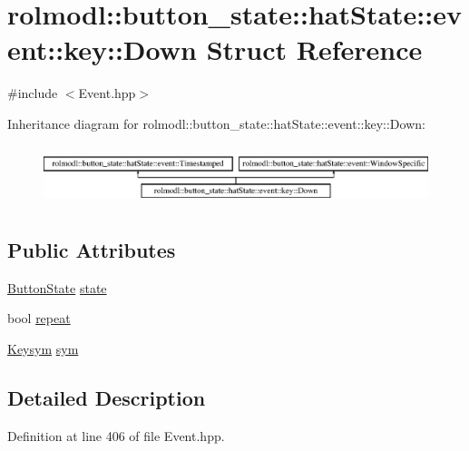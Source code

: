 \hypertarget{structrolmodl_1_1button__state_1_1hat_state_1_1event_1_1key_1_1_down}{}\section{rolmodl\+::button\+\_\+state\+::hat\+State\+::event\+::key\+::Down Struct Reference}
\label{structrolmodl_1_1button__state_1_1hat_state_1_1event_1_1key_1_1_down}


{\ttfamily \#include $<$Event.\+hpp$>$}

Inheritance diagram for rolmodl\+::button\+\_\+state\+::hat\+State\+::event\+::key\+::Down\+:\begin{figure}[H]
\begin{center}
\leavevmode
\includegraphics[height=1.761006cm]{structrolmodl_1_1button__state_1_1hat_state_1_1event_1_1key_1_1_down}
\end{center}
\end{figure}
\subsection*{Public Attributes}
\begin{DoxyCompactItemize}
\item 
\mbox{\hyperlink{namespacerolmodl_ad08ec5c56aa1db118f871357b2d475fd}{Button\+State}} \mbox{\hyperlink{structrolmodl_1_1button__state_1_1hat_state_1_1event_1_1key_1_1_down_ae559eb7cd15c7356e87bbf98fb99a433}{state}}
\item 
bool \mbox{\hyperlink{structrolmodl_1_1button__state_1_1hat_state_1_1event_1_1key_1_1_down_a55a7ee2bce64a0aeb71515d769fd5394}{repeat}}
\item 
\mbox{\hyperlink{structrolmodl_1_1button__state_1_1_keysym}{Keysym}} \mbox{\hyperlink{structrolmodl_1_1button__state_1_1hat_state_1_1event_1_1key_1_1_down_a7c4c614aaab0eb8e11a11824f7516e44}{sym}}
\end{DoxyCompactItemize}


\subsection{Detailed Description}


Definition at line 406 of file Event.\+hpp.



